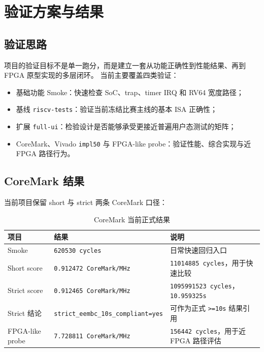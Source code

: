\section{验证方案与结果}

\subsection{验证思路}

项目的验证目标不是单一跑分，而是建立一套从功能正确性到性能结果、再到 FPGA 原型实现的多层闭环。
当前主要覆盖四类验证：

\begin{itemize}
    \item 基础功能 Smoke：快速检查 SoC、trap、timer IRQ 和 RV64 宽度路径；
    \item 基线 \texttt{riscv-tests}：验证当前冻结比赛主线的基本 ISA 正确性；
    \item 扩展 \texttt{full-ui}：检验设计是否能够承受更接近普遍用户态测试的矩阵；
    \item CoreMark、Vivado \texttt{impl50} 与 FPGA-like probe：验证性能、综合实现与近 FPGA 路径行为。
\end{itemize}

\subsection{CoreMark 结果}

当前项目保留 short 与 strict 两条 CoreMark 口径：

\begin{table}[H]
    \centering
    \caption{CoreMark 当前正式结果}
    \begin{tabular}{p{} p{} p{}}
        \toprule
        项目 & 结果 & 说明 \\
        \midrule
        Smoke & \texttt{620530 cycles} & 日常快速回归入口 \\
        Short score & \texttt{0.912472 CoreMark/MHz} & \texttt{11014885 cycles}，用于快速比较 \\
        Strict score & \texttt{0.912465 CoreMark/MHz} & \texttt{1095991523 cycles}，\texttt{10.959325s} \\
        Strict 结论 & \texttt{strict\_eembc\_10s\_compliant=yes} & 可作为正式 \texttt{>=10s} 结果引用 \\
        FPGA-like probe & \texttt{7.728811 CoreMark/MHz} & \texttt{156442 cycles}，用于近 FPGA 路径评估 \\
        \bottomrule
    \end{tabular}
\end{table}


